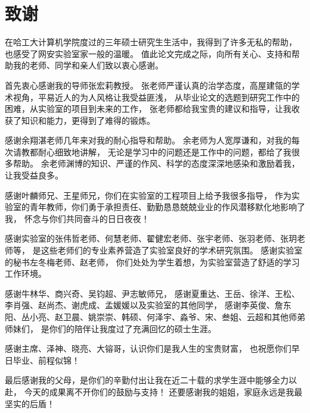 \chapter*{致\quad 谢}
{}

在哈工大计算机学院度过的三年硕士研究生生活中，我得到了许多无私的帮助，
也感受了网安实验室家一般的温暖。
值此论文完成之际，向所有关心、支持和帮助我的老师、同学和亲人们致以衷心感谢。

首先衷心感谢我的导师张宏莉教授。
张老师严谨认真的治学态度，高屋建瓴的学术视角，平易近人的为人风格让我受益匪浅，
从毕业论文的选题到研究工作中的困难，从实验室的项目到未来的工作，
张老师都给我宝贵的建议和指导，让我收获了知识和能力，更得到了难得的锻炼。

感谢余翔湛老师几年来对我的耐心指导和帮助。
余老师为人宽厚谦和，对我的每次请教都耐心细致地讲解，
无论是学习中的问题还是工作中的问题，都给了我很多帮助。
余老师渊博的知识、严谨的作风、科学的态度深深地感染和激励着我，让我受益良多。

感谢叶麟师兄、王星师兄，你们在实验室的工程项目上给予我很多指导，
作为实验室的青年教师，你们勇于承担责任、勤勤恳恳兢兢业业的作风潜移默化地影响了我，
怀念与你们共同奋斗的日日夜夜！

感谢实验室的张伟哲老师、何慧老师、翟健宏老师、张宇老师、张羽老师、张玥老师等，
是这些老师们的专业素养营造了实验室良好的学术研究氛围。
感谢实验室的秘书左冬梅老师、赵老师，
你们处处为学生着想，为实验室营造了舒适的学习工作环境。

感谢牛林华、商兴奇、吴钧超、尹志敏师兄，
感谢夏重达、王岳、徐洋、王松、李肖强、赵尚杰、谢虎成、孟媛媛以及实验室的其他同学，
感谢李英俊、詹东阳、丛小亮、赵卫晨、姚崇崇、韩硕、何泽宇、淼爷、宋、叁姐、云超和其他师弟师妹们，
是你们的陪伴让我度过了充满回忆的硕士生涯。

感谢主席、泽神、晓亮、大镕哥，认识你们是我人生的宝贵财富，
也祝愿你们早日毕业、前程似锦！

最后感谢我的父母，是你们的辛勤付出让我在近二十载的求学生涯中能够全力以赴，
今天的成果离不开你们的鼓励与支持！
还要感谢我的姐姐，家庭永远是我最坚实的后盾！
